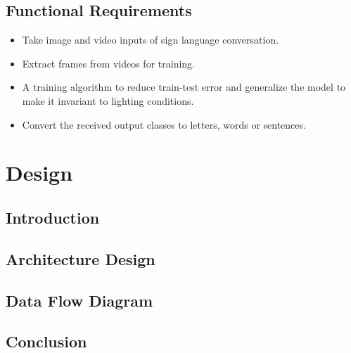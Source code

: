 \documentclass[12pt,oneside,a4paper]{article}
\newcommand\todo[1]{\textcolor{blue}{#1}}
\newcommand\placeholder[1]{\todo{\lipsum[#1]}}
\begin{document}
		\subsection{Functional Requirements}

			\begin{itemize}
				\item Take image and video inputs of sign language conversation.
				\item Extract frames from videos for training.
				\item A training algorithm to reduce train-test error and generalize the model to make it invariant to lighting conditions.
				\item Convert the received output classes to letters, words or sentences.
			\end{itemize}

	\section{Design}

		\subsection{Introduction}
			\placeholder{1}

		\subsection{Architecture Design}
			\placeholder{2}

		\subsection{Data Flow Diagram}
			\placeholder{23}

		\subsection{Conclusion}
			\placeholder{4}

	\newpage
	
	{}
\end{document}
